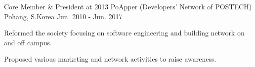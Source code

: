 

\begin{cventries}

  \cventry
  {Core Member \& President at 2013} %
  {PoApper (Developers' Network of POSTECH)} %
  {Pohang, S.Korea} %
  {Jun. 2010 - Jun. 2017} %
  {
    \begin{cvitems} %
      \item {Reformed the society focusing on software engineering and building network on and off campus.}
      \item {Proposed various marketing and network activities to raise awareness.}
    \end{cvitems}
  }
\end{cventries}



